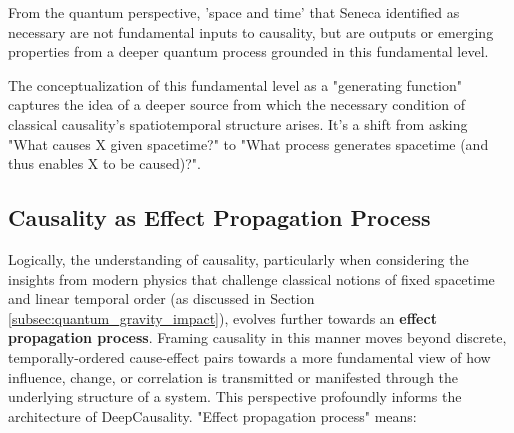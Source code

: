 From the quantum perspective, 'space and time' that Seneca identified as necessary are not fundamental inputs to causality, but are outputs or emerging properties from a deeper quantum process grounded in this fundamental level.

The conceptualization of this fundamental level as a "generating function" captures the idea of a deeper source from which the necessary condition of classical causality's spatiotemporal structure arises. It's a shift from asking "What causes X given spacetime?" to "What process generates spacetime (and thus enables X to be caused)?".

\subsection{Causality as Effect Propagation Process}
\label{subsec:effect_propagation_process}

Logically, the understanding of causality, particularly when considering the insights from modern physics that challenge classical notions of fixed spacetime and linear temporal order (as discussed in Section \ref{subsec:quantum_gravity_impact}), evolves further towards an \textbf{effect propagation process}. Framing causality in this manner moves beyond discrete, temporally-ordered cause-effect pairs towards a more fundamental view of how influence, change, or correlation is transmitted or manifested through the underlying structure of a system. This perspective profoundly informs the architecture of DeepCausality. "Effect propagation process" means:

